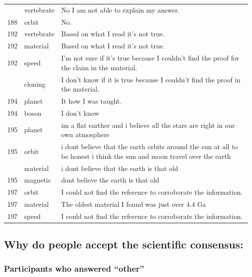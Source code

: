 \documentclass[
  doc,floatsintext]{apa6}
\begin{document}
\begin{longtable}[t]{>{}r>{}l>{\raggedright\arraybackslash}p{30em}}
\addlinespace
188 & vertebrate & No I am not able to explain my answer.\\
188 & orbit & No.\\
192 & vertebrate & Based on what I read it’s not true.\\
192 & material & Based on what I read it’s not true.\\
192 & speed & I’m not sure if it’s true because I couldn’t find the proof for the claim in the material.\\
\addlinespace
192 & cloning & I don’t know if it is true because I couldn’t find the proof in the material.\\
194 & planet & It how I was taught.\\
194 & boson & I don't know\\
195 & planet & im a flat earther and i believe all the stars are right in our own atmosphere\\
195 & orbit & i dont believe that the earth orbits around the sun at all to be honest i think the sun and moon travel over the earth\\
\addlinespace
195 & material & i dont believe that the earth is that old\\
195 & magnetic & dont believe the earth is that old\\
197 & orbit & I could not find the reference to corroborate the information.\\
197 & material & The oldest material I found was just over 4.4 Ga\\
197 & speed & I could not find the reference to corroborate the information.\\
\bottomrule
\end{longtable}

\subsection{Why do people accept the scientific consensus:}\label{why-do-people-accept-the-scientific-consensus-1}

\subsubsection{Participants who answered ``other''}\label{participants-who-answered-other-2}
\end{document}
